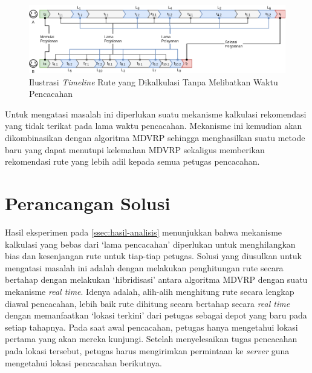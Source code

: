 \begin{figure}[!]
	\centering
	\includegraphics[width=\textwidth]{Resources/Images/illustration-timeline-mdvrp}
	\caption{Ilustrasi \textit{Timeline} Rute yang Dikalkulasi Tanpa Melibatkan Waktu Pencacahan}
	\label{fig:illustration-timeline-mdvrp-no-service-time}
\end{figure}


Untuk mengatasi masalah ini diperlukan suatu mekanisme kalkulasi rekomendasi yang tidak terikat pada lama waktu pencacahan. Mekanisme ini kemudian akan dikombinasikan dengan algoritma MDVRP sehingga menghasilkan suatu metode baru yang dapat menutupi kelemahan MDVRP sekaligus memberikan rekomendasi rute yang lebih adil kepada semua petugas pencacahan. 


\section{Perancangan Solusi}
\label{sec:design}
Hasil eksperimen pada \autoref{ssec:hasil-analisis} menunjukkan bahwa mekanisme kalkulasi yang bebas dari `lama pencacahan' diperlukan untuk menghilangkan bias dan kesenjangan rute untuk tiap-tiap petugas. Solusi yang diusulkan untuk mengatasi masalah ini adalah dengan melakukan penghitungan rute secara bertahap dengan melakukan `hibridisasi' antara algoritma MDVRP dengan suatu mekanisme \textit{real time}. Idenya adalah, alih-alih menghitung rute secara lengkap diawal pencacahan, lebih baik rute dihitung secara bertahap secara \textit{real time} dengan memanfaatkan `lokasi terkini' dari petugas sebagai depot yang baru pada setiap tahapnya. Pada saat awal pencacahan, petugas hanya mengetahui lokasi pertama yang akan mereka kunjungi. Setelah menyelesaikan tugas pencacahan pada lokasi tersebut, petugas harus mengirimkan permintaan ke \textit{server} guna mengetahui lokasi pencacahan berikutnya.

